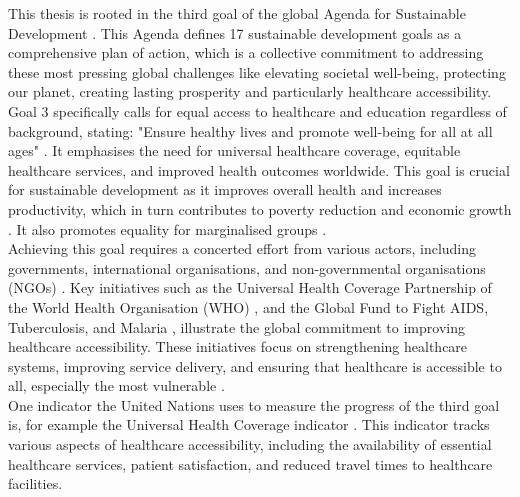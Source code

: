 \documentclass[11pt, a4paper]{report}
\begin{document}
This thesis is rooted in the third goal of the global Agenda for Sustainable Development \citep{united_nations_transforming_2015}. This Agenda defines 17 sustainable development goals as a comprehensive plan of action, which is a collective commitment to addressing these most pressing global challenges like elevating societal well-being, protecting our planet, creating lasting prosperity and particularly healthcare accessibility. \\
%
Goal 3 specifically calls for equal access to healthcare and education regardless of background, stating: "Ensure healthy lives and promote well-being for all at all ages" \citep{united_nations_transforming_2015}. It emphasises the need for universal healthcare coverage, equitable healthcare services, and improved health outcomes worldwide. This goal is crucial for sustainable development as it improves overall health and increases productivity, which in turn contributes to poverty reduction and economic growth  \citep{zhao_economic_2016}. It also promotes equality for marginalised groups  \citep{davy_access_2016}. \\
%
Achieving this goal requires a concerted effort from various actors, including governments, international organisations, and non-governmental organisations (NGOs) \citep{sanadgol_engagement_2021}. Key initiatives such as the Universal Health Coverage Partnership of the World Health Organisation (WHO) \citep{uhc-partnership_universal_2021}, and the Global Fund to Fight AIDS, Tuberculosis, and Malaria \citep{the_global_fund_global_2024}, illustrate the global commitment to improving healthcare accessibility. These initiatives focus on strengthening healthcare systems, improving service delivery, and ensuring that healthcare is accessible to all, especially the most vulnerable \citep{syed_traveling_2013}. \\
%
One indicator the United Nations uses to measure the progress of the third goal is, for example the Universal Health Coverage indicator \citep{world_health_organization_tracking_2023}. This indicator tracks various aspects of healthcare accessibility, including the availability of essential healthcare services, patient satisfaction, and reduced travel times to healthcare facilities. 
\end{document}
